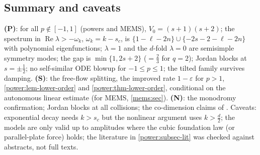 \subsection{Summary and caveats}
\label{power:subsec-summary}

\textbf{(P)}: for all $p\notin[-1,1]$ (powers and MEMS), $V_0=(s+1)(s+2)$; the
spectrum in $\operatorname{Re}\lambda>-\omega_k$, $\omega_k=k-s_c$, is
$\{1-\ell-2n\}\cup\{-2s-2-\ell-2n\}$ with polynomial eigenfunctions; $\lambda=1$ and
the $d$-fold $\lambda=0$ are semisimple symmetry modes; the gap is
$\min\{1,2s+2\}$ ($=\frac23$ for $q=2$); Jordan blocks at $s=\pm\frac12$; no
self-similar ODE blowup for $-1\le p\le1$; the tilted family survives damping.
\textbf{(S)}: the free-flow splitting, the improved rate $1-\varepsilon$ for $p>1$,
\cref{power:lem-lower-order} and \cref{power:thm-lower-order}, conditional on the
autonomous linear estimate (for MEMS, \cref{mems:sec}). \textbf{(N)}: the
monodromy confirmation; Jordan blocks at all collisions; the co-dimension
claims of \cite{BizonMaisonWasserman2007}. Caveats: exponential decay needs
$k>s_c$ but the nonlinear argument uses $k>\frac d2$; the models are only valid up
to amplitudes where the cubic foundation law (or parallel-plate force) holds;
the literature in \cref{power:subsec-lit} was checked against abstracts, not
full texts.
